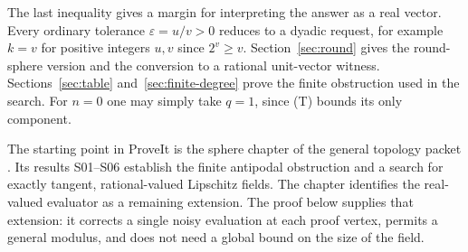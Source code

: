 The last inequality gives a margin for interpreting the answer as a
real vector. Every ordinary tolerance $\varepsilon=u/v>0$ reduces to
a dyadic request, for example $k=v$ for positive integers $u,v$ since
$2^v\ge v$. Section~\ref{sec:round} gives the round-sphere version and
the conversion to a rational unit-vector witness. Sections~\ref{sec:table}
and~\ref{sec:finite-degree} prove the finite obstruction used in the search.
For $n=0$ one may simply take $q=1$, since (T) bounds its only component.

The starting point in ProveIt is the sphere chapter of the general
topology packet \cite{spheres}. Its results S01--S06 establish the
finite antipodal obstruction and a search for exactly tangent,
rational-valued Lipschitz fields. The chapter identifies the
real-valued evaluator as a remaining extension. The proof below
supplies that extension: it corrects a single noisy evaluation
at each proof vertex, permits a general modulus, and does not need a
global bound on the size of the field.
